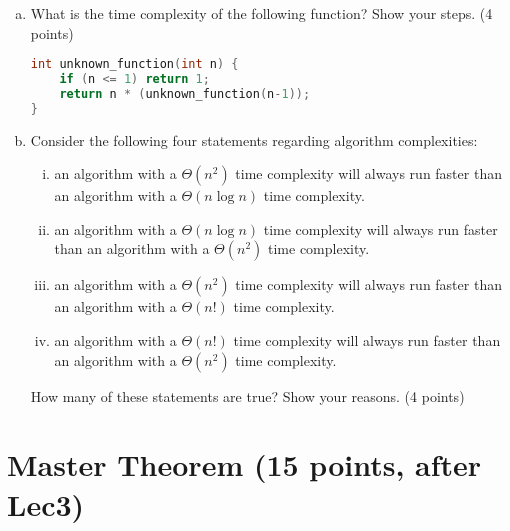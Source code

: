 \documentclass[11pt]{exam}
\begin{document}
\begin{enumerate}[(a)]
\item What is the time complexity of the following function? Show your steps. (4 points)
\begin{lstlisting}[language=c++]
int unknown_function(int n) {
	if (n <= 1) return 1;
	return n * (unknown_function(n-1));
}
\end{lstlisting}
\begin{solution}
\end{solution}

\item Consider the following four statements regarding algorithm complexities:
\begin{enumerate}[i)]
\item an algorithm with a $\Theta(n^2)$ time complexity will always run faster than an algorithm with a $\Theta(n \log n)$ time complexity.
\item an algorithm with a $\Theta(n \log n)$ time complexity will always run faster than an algorithm with a $\Theta(n^2)$ time complexity.
\item an algorithm with a $\Theta(n^2)$ time complexity will always run faster than an algorithm with a $\Theta(n!)$ time complexity.
\item an algorithm with a $\Theta(n!)$ time complexity will always run faster than an algorithm with a $\Theta(n^2)$ time complexity.
\end{enumerate}

How many of these statements are true? Show your reasons. (4 points)
\begin{solution}
\end{solution}

\end{enumerate}
\newpage
\section{Master Theorem (15 points, after Lec3)}
\end{document}

